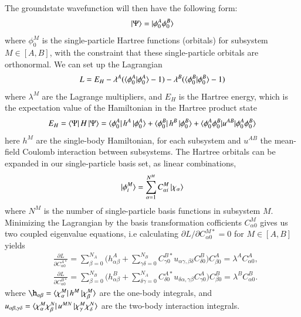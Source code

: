 \documentclass{subfiles}
\begin{document}
The groundstate wavefunction will then have the following form:
\begin{align*}
    \ket{\Psi} = \ket{\phi^A_0\phi^B_0}
\end{align*}
where $\phi_0^M$ is the single-particle Hartree functions (orbitals) for subsystem $M\in[A,B]$, with the constraint that these single-particle orbitals are orthonormal. We can set up the Lagrangian
\begin{align*}
    L = E_H - \lambda^A(\braket{\phi^A_0|\phi^A_0} - 1) - \lambda^B(\braket{\phi^B_0|\phi^B_0} - 1)
\end{align*}
where $\lambda^M$ are the Lagrange multipliers, and $E_H$ is the Hartree energy, which is the expectation value of the Hamiltonian in the Hartree product state
\begin{align*}
    E_H = \bra{\Psi}H\ket{\Psi} = \bra{\phi^A_0}h^A\ket{\phi^A_0} + \bra{\phi^B_0}h^B\ket{\phi^B_0} + \braket{\phi^A_0\phi^B_0|u^{AB}|\phi^A_0\phi^B_0}
\end{align*}
here $h^M$ are the single-body Hamiltonian, for each subsystem and $u^{AB}$ the mean-field Coulomb interaction between subsystems. The Hartree orbitals can be expanded in our single-particle basis set, as linear combinations, 
\begin{align*}
    \ket{\phi^M_i} = \sum_{\alpha=1}^{N^M} C^M_{\alpha i}\ket{\chi_\alpha}
\end{align*}
where $N^M$ is the number of single-particle basis functions in subsystem $M$. Minimizing the Lagrangian by the basis transformation cofficients $C_{\alpha 0}^M$ gives us two coupled eigenvalue equations, i.e calculating $\partial L/\partial C_{\alpha 0}^{M*} = 0$ for $M\in[A,B]$ yields
\begin{align}
    &\frac{\partial L}{\partial C_{\alpha 0}^{A*}}  = \sum_{\beta=0}^{N_A}\big(h_{\alpha\beta}^A + \sum^{N_B}_{\gamma\delta=0}C^{B*}_{\gamma0} u_{\alpha\gamma,\beta\delta}C^B_{\delta0} \big)C^A_{\beta 0}  = \lambda^AC^A_{\alpha 0},\nonumber \\
    &\frac{\partial L}{\partial C_{\alpha 0}^{B*}}  = \sum_{\beta=0}^{N_B}\big(h_{\alpha\beta}^B + \sum^{N_A}_{\delta\gamma=0}C^{A*}_{\delta0} u_{\delta\alpha,\gamma\beta}C^A_{\gamma0} \big)C^B_{\beta 0}  = \lambda^BC^B_{\alpha 0}.\label{eq:bipartite_hartree}
\end{align}
where $\h_{\alpha\beta} = \bra{\chi_\alpha^M}h^M\ket{\chi_\beta^M}$ are the one-body integrals, and $u_{\alpha\beta,\gamma\delta} = \bra{\chi_\alpha^M\chi_\beta^N}u^{MN}\ket{\chi_\gamma^M\chi_\delta^N}$ are the two-body interaction integrals.  \\\\
\end{document}
